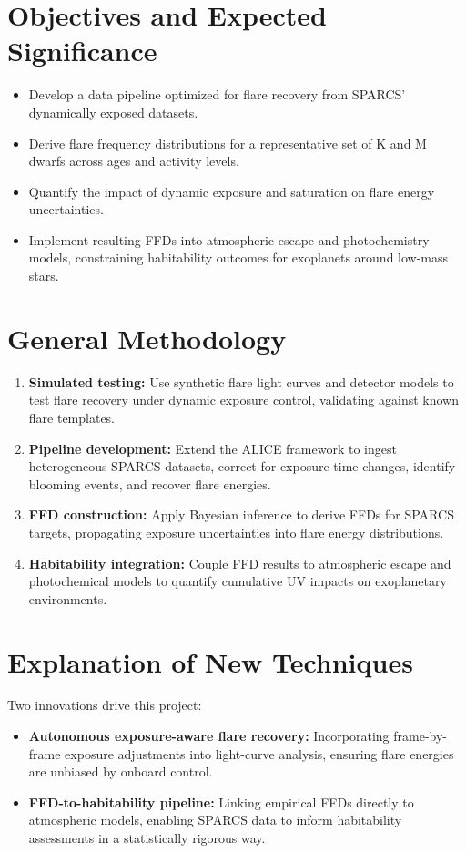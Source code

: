 \documentclass[final,letterpaper,oneside,12pt]{article}
\begin{document}
\section{Objectives and Expected Significance}
\begin{itemize}
    \item Develop a data pipeline optimized for flare recovery from SPARCS’ dynamically exposed datasets.
    \item Derive flare frequency distributions for a representative set of K and M dwarfs across ages and activity levels.
    \item Quantify the impact of dynamic exposure and saturation on flare energy uncertainties.
    \item Implement resulting FFDs into atmospheric escape and photochemistry models, constraining habitability outcomes for exoplanets around low-mass stars.
\end{itemize}

\section{General Methodology}
\begin{enumerate}
    \item \textbf{Simulated testing:} Use synthetic flare light curves and detector models to test flare recovery under dynamic exposure control, validating against known flare templates.
    \item \textbf{Pipeline development:} Extend the ALICE framework \citep{Ramiaramanantsoa2025} to ingest heterogeneous SPARCS datasets, correct for exposure-time changes, identify blooming events, and recover flare energies.
    \item \textbf{FFD construction:} Apply Bayesian inference to derive FFDs for SPARCS targets, propagating exposure uncertainties into flare energy distributions.
    \item \textbf{Habitability integration:} Couple FFD results to atmospheric escape and photochemical models \citep{Segura2010,Luger2015} to quantify cumulative UV impacts on exoplanetary environments.
\end{enumerate}

\section{Explanation of New Techniques}
Two innovations drive this project:
\begin{itemize}
    \item \textbf{Autonomous exposure-aware flare recovery:} Incorporating frame-by-frame exposure adjustments into light-curve analysis, ensuring flare energies are unbiased by onboard control.
    \item \textbf{FFD-to-habitability pipeline:} Linking empirical FFDs directly to atmospheric models, enabling SPARCS data to inform habitability assessments in a statistically rigorous way.
\end{itemize}
\end{document}
